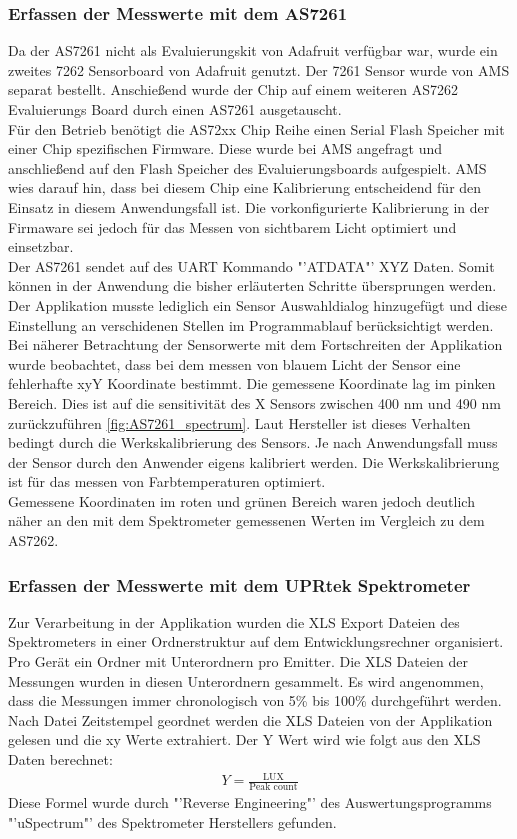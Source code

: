 \documentclass[11pt]{scrartcl}
\begin{document}
\subsubsection{Erfassen der Messwerte mit dem AS7261} \label{measuringWith7261}
Da der AS7261 nicht als Evaluierungskit von Adafruit verfügbar war, wurde ein zweites 7262 Sensorboard von Adafruit genutzt. Der 7261 Sensor
wurde von AMS separat bestellt. Anschießend wurde der Chip auf einem weiteren AS7262 Evaluierungs Board durch einen AS7261 ausgetauscht.\\
Für den Betrieb benötigt die AS72xx Chip Reihe einen Serial Flash Speicher mit einer Chip spezifischen Firmware. Diese wurde bei AMS angefragt
und anschließend auf den Flash Speicher des Evaluierungsboards aufgespielt. AMS wies darauf hin, dass bei diesem Chip eine Kalibrierung entscheidend
für den Einsatz in diesem Anwendungsfall ist. Die vorkonfigurierte Kalibrierung in der Firmaware sei jedoch für das Messen von sichtbarem Licht
optimiert und einsetzbar.\\
Der AS7261 sendet auf des UART Kommando "'ATDATA"' XYZ Daten. Somit können in der Anwendung die bisher erläuterten Schritte übersprungen werden.
Der Applikation musste lediglich ein Sensor Auswahldialog hinzugefügt und diese Einstellung an verschidenen Stellen im Programmablauf
berücksichtigt werden.\\
Bei näherer Betrachtung der Sensorwerte mit dem Fortschreiten der Applikation wurde beobachtet, dass bei dem messen von blauem Licht der Sensor
eine fehlerhafte xyY Koordinate bestimmt. Die gemessene Koordinate lag im pinken Bereich. Dies ist auf die sensitivität des X Sensors zwischen
400 nm und 490 nm zurückzuführen \ref{fig:AS7261_spectrum}. Laut Hersteller ist dieses Verhalten bedingt durch die Werkskalibrierung des Sensors.
Je nach Anwendungsfall muss der Sensor durch den Anwender eigens kalibriert werden. Die Werkskalibrierung ist für das messen von Farbtemperaturen
optimiert.\\
Gemessene Koordinaten im roten und grünen Bereich waren jedoch deutlich näher an den mit dem Spektrometer gemessenen Werten im Vergleich zu
dem AS7262. %
\subsubsection{Erfassen der Messwerte mit dem UPRtek Spektrometer}
Zur Verarbeitung in der Applikation wurden die XLS Export Dateien des Spektrometers in einer Ordnerstruktur auf dem Entwicklungsrechner organisiert.
Pro Gerät ein Ordner mit Unterordnern pro Emitter. Die XLS Dateien der Messungen wurden in diesen Unterordnern gesammelt. Es wird angenommen, dass die
Messungen immer chronologisch von 5\% bis 100\% durchgeführt werden. Nach Datei Zeitstempel geordnet werden die XLS Dateien von der Applikation gelesen
und die xy Werte extrahiert. Der Y Wert wird wie folgt aus den XLS Daten berechnet:
\begin{align}\label{Equ:23}
    Y = \frac{\text{LUX}}{\text{Peak count}}
\end{align}
Diese Formel wurde durch "'Reverse Engineering"' des Auswertungsprogramms "'uSpectrum"' des Spektrometer Herstellers gefunden.
\end{document}
